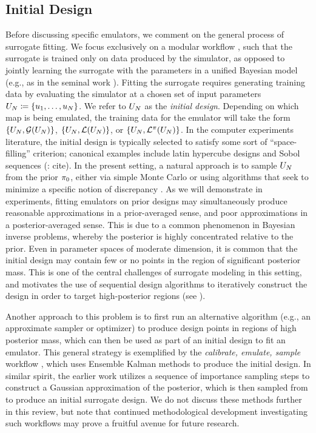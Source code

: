 \documentclass[12pt]{article}
\begin{document}
\subsection{Initial Design}
Before discussing specific emulators, we comment on the general process of surrogate fitting.
We focus exclusively on a modular workflow \citep{modularization}, such that the surrogate is
 trained only on data produced
by the simulator, as opposed to jointly learning the surrogate with the parameters in a 
unified Bayesian model (e.g., as in the seminal work \citet{KOH}). Fitting the surrogate requires 
generating training data by evaluating the simulator at a chosen set of input parameters
$U_{N} \coloneqq \{u_1, \dots, u_{N}\}$. We refer to $U_{N}$ as the \textit{initial design}.
Depending on which map is being emulated, the training data for the emulator will take the form 
$\{U_{N}, \mathcal{G}(U_{N})\}$, $\{U_{N}, \mathcal{L}(U_{N})\}$, or $\{U_{N}, \mathcal{L}^{\pi}(U_{N})\}$. 
In the computer experiments literature, 
the initial design is typically selected to satisfy some sort of ``space-filling'' criterion; canonical examples 
include latin hypercube designs and Sobol sequences (\todo: cite). In the present setting, a natural 
approach is to sample $U_{N}$ from the prior $\pi_0$, either via simple Monte Carlo or using 
algorithms that seek to minimize a specific notion of discrepancy \citep{supportPoints, SteinPoints}.
As we will demonstrate in experiments, fitting emulators on prior designs may simultaneously produce 
reasonable approximations in a prior-averaged sense, and poor approximations in a posterior-averaged
sense. This is due to a common phenomenon in Bayesian inverse problems, whereby the posterior is highly 
concentrated relative to the prior. Even in parameter spaces of moderate dimension, it is common that 
the initial design may contain few or no points in the region of significant posterior mass. This is one of the
central challenges of surrogate modeling in this setting, and motivates the use of sequential design algorithms
to iteratively construct the design in order to target high-posterior regions (see ).

Another approach to this problem is to first run an alternative algorithm (e.g., an approximate 
sampler or optimizer) to produce design points in regions of high posterior mass, which can then 
be used as part of an initial design to fit an emulator. This general strategy is exemplified by the 
\textit{calibrate, emulate, sample} workflow \citep{CES,idealizedGCM,CESSoftware}, which uses 
Ensemble Kalman methods to produce the initial design. In similar spirit, the earlier work 
\citet{emPostDens} utilizes a sequence of importance sampling steps to construct a Gaussian 
approximation of the posterior, which is then sampled from to produce an initial surrogate design.
We do not discuss these methods further in this review, but note that continued methodological 
development investigating such workflows may prove a fruitful avenue for future research. 
\end{document}
